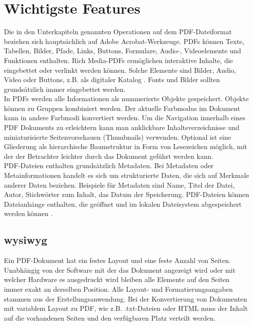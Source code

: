 \section{Wichtigste Features}
Die in den Unterkapiteln genannten Operationen auf dem PDF-Dateiformat beziehen sich hauptsächlich auf Adobe Acrobat-Werkzeuge. PDFs können Texte, Tabellen, Bilder, Pfade, Links, Buttons, Formulare, Audio-, Videoelemente und Funktionen enthalten. Rich Media-PDFs ermöglichen interaktive Inhalte, die eingebettet oder verlinkt werden können. Solche Elemente sind Bilder, Audio, Video oder Buttons, z.B. als digitaler Katalog \cite{wiki-pdf-engl}. Fonts und Bilder sollten grundsätzlich immer eingebettet werden. \\
In PDFs werden alle Informationen als nummerierte Objekte gespeichert. Objekte können zu Gruppen kombiniert werden. Der aktuelle Farbmodus im Dokument kann in andere Farbmodi konvertiert werden. Um die Navigation innerhalb eines PDF Dokuments zu erleichtern kann man anklickbare Inhaltsverzeichnisse und miniaturisierte Seitenvorschauen (Thumbnails) verwenden. Optional ist eine Gliederung als hierarchische Baumstruktur in Form von Lesezeichen möglich, mit der der Betrachter leichter durch das Dokument geführt werden kann. \\
PDF-Dateien enthalten grundsätzlich Metadaten. Bei Metadaten oder Metainformationen handelt es sich um strukturierte Daten, die sich auf Merkmale anderer Daten beziehen. Beispiele für Metadaten sind Name, Titel der Datei, Autor, Stichwörter zum Inhalt, das Datum der Speicherung. PDF-Dateien können Dateianhänge enthalten, die geöffnet und im lokalen Dateisystem abgespeichert werden können \cite{wiki-pdf-engl}. 

\subsection{\gls{wysiwyg}}
Ein PDF-Dokument hat ein festes Layout und eine feste Anzahl von Seiten. Unabhängig von der Software mit der das Dokument angezeigt wird oder mit welcher Hardware es ausgedruckt wird bleiben alle Elemente auf den Seiten immer exakt an derselben Position. Alle Layout- und Formatierungsangaben stammen aus der Erstellungsanwendung. Bei der Konvertierung von Dokumenten mit variablem Layout zu PDF, wie z.B. .txt-Dateien oder HTML muss der Inhalt auf die vorhandenen Seiten und den verfügbaren Platz verteilt werden. 

